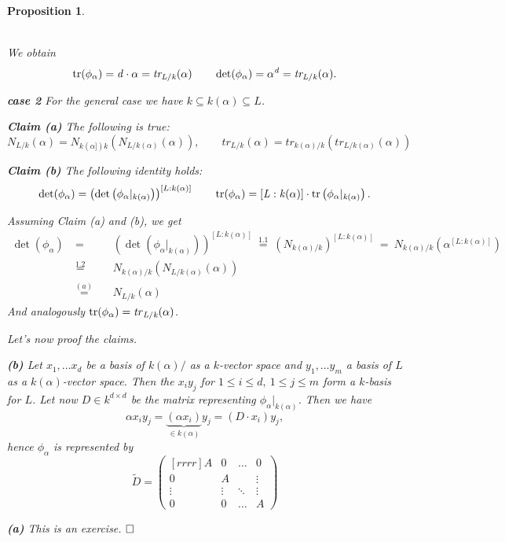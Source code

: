 \documentclass[11pt]{book}
\newtheorem{proposition}[theorem]{Proposition}
\theoremstyle{nonumberbreak}
\newenvironment{pr}[1][]{\ifthenelse{\equal{#1}{}}{\proof}{\proof[#1]}\rm}{\endproof}
\begin{document}
\begin{spacing}{1.3}
\begin{proposition}
\begin{pr}
\begin{compactitem}
\\ We obtain 
$$\rm{tr}\it(\phi_{\alpha})=d \cdot \alpha = tr_{L/k}(\alpha) \qquad \det(\phi_{\alpha})=\alpha^d = tr_{L/k}(\alpha).$$
\item[\textbf{case 2}] For the general case we have $k\subseteq k(\alpha) \subseteq L$.\\
\begin{compactitem}
\item[\textbf{Claim (a)}] The following is true: $$N_{L/k}(\alpha)=N_{k(\alpha])k} \left(N_{L/k(\alpha)}(\alpha)\right), \qquad tr_{L/k}(\alpha)=tr_{k(\alpha)/k}\left(tr_{L/k(\alpha)}(\alpha)\right)$$
\item[\textbf{Claim (b)}] The following identity holds:
$$\det(\phi_{\alpha})=\left(\det\left(\phi_{\alpha}|_{k(\alpha)}\right)\right)^{[L:k(\alpha)]} \qquad \rm{tr}\it(\phi_{\alpha})=[L:k(\alpha)] \cdot \rm{tr}\it\left(\phi_{\alpha}|_{k(\alpha)}\right).$$
\end{compactitem}
Assuming Claim (a) and (b), we get
\begin{alignat*}{5}
\det(\phi_{\alpha})\ &=&&\ \left(\det\left(\phi_{\alpha}|_{k(\alpha)}\right)\right)^{[L:k(\alpha)]} \ \overset{1.1}{=}\ \left(N_{k(\alpha)/k}\right)^{[L:k(\alpha)]}\ =\ N_{k(\alpha)/k}\left(\alpha^{[L:k(\alpha)]}\right)\\
\ &\overset{1.2}{=}&&\ N_{k(\alpha)/k}\left(N_{L/k(\alpha)}(\alpha)\right)\\
\ &\overset{(a)}{=}&&\ N_{L/k}(\alpha)
\end{alignat*}
And analogously
$\rm{tr}\it(\phi_{\alpha})= \it{tr}_{L/k}(\alpha)$.
\end{compactitem}
Let's now proof the claims.
\begin{compactitem}
\item[\textbf{(b)}]  Let $x_1, \ldots x_d$ be a basis of $k(\alpha)/$ as a $k$-vector space and $y_1, \ldots y_m$ a basis of $L$ as a $k(\alpha)$-vector space.
Then the $x_iy_j$ for $1 \leqslant i \leqslant d, \ 1 \leqslant j \leqslant m$ form a $k$-basis for $L$. 
Let now $D \in k^{d \times d}$ be the matrix representing $\phi_{\alpha}|_{k(\alpha)}$. Then we have
$$\alpha x_i y_j = \underbrace{\left(\alpha x_i\right)}_{\in k(\alpha)}y_j = \left(D \cdot x_i\right) y_j,$$
hence $\phi_{\alpha}$ is represented by
$$\tilde{D}= \begin{pmatrix}[rrrr] A & 0 & \ldots & 0 \\ 0 & A & & \vdots \\ \vdots & \vdots & \ddots & \vdots \\ 0 & 0 & \ldots & A \end{pmatrix}$$
\item[\textbf{(a)}] This is an exercise. $\hfill \Box$
\end{compactitem}
\end{pr}
\end{proposition}


\end{spacing}
\end{document}
